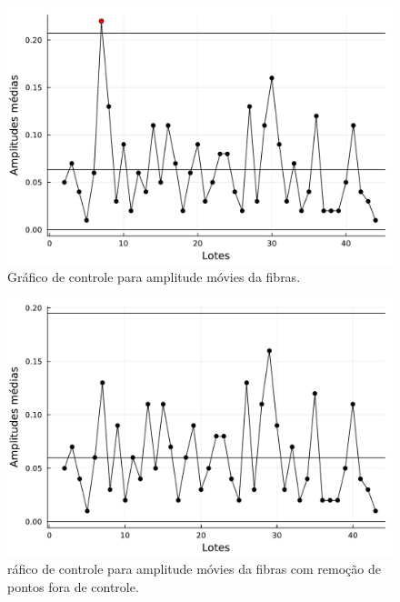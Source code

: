 \documentclass[
  letterpaper,
  DIV=11,
  numbers=noendperiod]{scrartcl}
\begin{document}
\begin{figure}[H]

{\centering \includegraphics{relatorio_files/figure-pdf/fig-3-J1.pdf}

}

\caption{\label{fig-3}Gráfico de controle para amplitude móvies da
fibras.}

\end{figure}

\begin{figure}[H]

{\centering \includegraphics{relatorio_files/figure-pdf/fig-4-J1.pdf}

}

\caption{\label{fig-4}ráfico de controle para amplitude móvies da fibras
com remoção de pontos fora de controle.}

\end{figure}
\end{document}
